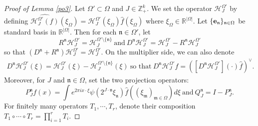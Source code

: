 \documentclass[11 pt,letterpaper]{amsart}
\theoremstyle{plain}
\theoremstyle{definition}
\theoremstyle{remark} \theoremstyle{exam} \theoremstyle{ob}
\numberwithin{equation}{section}
\begin{document}
\begin{proof}[Proof of Lemma \ref{po3}]
	Let $\Omega'\subset \Omega$ and $J\in \mathbb{Z}_+^k$.  We set the operator $ \mathcal{H}^{\Omega'}_J$ by defining $\widehat{\mathcal{H}^{\Omega'}_J(f)}(\xi_{\Omega})=\mathcal{H}^{\Omega'}_{J}(\xi_{\Omega}) \widehat{f}(\xi_{\Omega})$ where $\xi_{\Omega}\in \mathbb{R}^{|\Omega|}$.
	Let $\{ {\bf e}_{\mathfrak{n}}\}_{\mathfrak{n}\in \Omega}$ be standard basis in $\mathbb{R}^{|\Omega|}$. Then for each $\mathfrak{n}\in \Omega'$, let
	$$R^{\mathfrak{n}} \mathcal{H}^{\Omega'}_J = \mathcal{H}_J^{\Omega'\setminus \{\mathfrak{n}\}}\ \text{and}\ D^{\mathfrak{n}}\mathcal{H}^{\Omega'}_J  = \mathcal{H}^{\Omega'}_J- R^{\mathfrak{n}} \mathcal{H}^{\Omega'}_J$$
	so that $ ( D^{\mathfrak{n}}+ R^{\mathfrak{n}}) \mathcal{H}^{\Omega'}_J=\mathcal{H}^{\Omega'}_J.$ 
	On the multiplier side,  we can also denote 
	\begin{align}\label{0bb}
		D^{\mathfrak{n}}\mathcal{H}^{\Omega'}_J (\xi)=\mathcal{H}^{\Omega'}_J (\xi)-\mathcal{H}^{\Omega'\setminus \{\mathfrak{n}\}}_J (\xi)\ \text{so that}\ 
		D^{\mathfrak{n}}\mathcal{H}^{\Omega'}_Jf= \left([D^{\mathfrak{n}}\mathcal{H}^{\Omega'}_J](\cdot)\widehat{f}\right)^{\vee}.\end{align}
	Moreover, for   $J $ and $\mathfrak{n}\in \Omega$, set the two projection operators:
	$$P_J^{\mathfrak{n}}f(x)=\int e^{2\pi i x\cdot \xi} \psi\left(2^{J\cdot \mathfrak{n}} \xi_{\mathfrak{n}} \right) \widehat{f}\left((\xi_{\mathfrak{m}} )_{\mathfrak{m}\in \Omega} \right) d\xi \ \text{and}\    Q_J^{\mathfrak{n}}=I-P_J^{\mathfrak{n}}.$$
	For finitely many operators $T_1,\cdots,T_r$, denote their composition $T_1\circ \cdots \circ T_r= \prod_{i=1}^r T_i $.
	

\end{proof}
\end{document}
